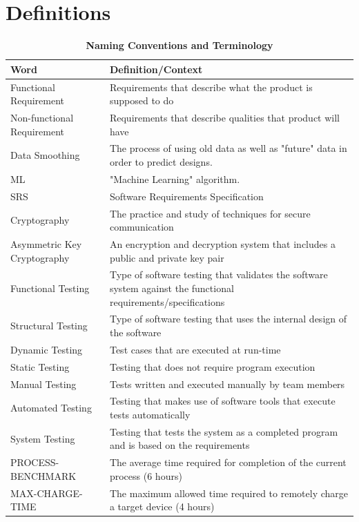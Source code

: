 \documentclass[12pt, titlepage]{article}
\begin{document}
\section{Definitions}
\begin{table}[H]
\caption{\bf Naming Conventions and Terminology}
\begin{tabular}{ |p{6cm}|p{8cm}|  } 
 \hline
\bf Word & \bf Definition/Context\\
 \hline
 Functional Requirement & Requirements that describe what the product is supposed to do\\
 \hline
Non-functional Requirement & Requirements that describe qualities that product will have\\
\hline
Data Smoothing & The process of using old data as well as "future" data in order to predict designs.\\
\hline
ML & "Machine Learning" algorithm.\\
\hline
SRS & Software Requirements Specification\\
\hline
Cryptography & The practice and study of techniques for secure communication\\
\hline
Asymmetric Key Cryptography & An encryption and decryption system that includes a public and private key pair\\
\hline
Functional Testing & Type of software testing that validates the software system against the functional requirements/specifications\\
\hline
Structural Testing & Type of software testing that uses the internal design of the software\\
\hline
Dynamic Testing & Test cases that are executed at run-time\\
\hline
Static Testing & Testing that does not require program execution\\
\hline
Manual Testing & Tests written and executed manually by team members\\
\hline
Automated Testing & Testing that makes use of software tools that execute tests automatically\\
\hline
System Testing & Testing that tests the system as a completed program and is based on the requirements\\
\hline
PROCESS-BENCHMARK & The average time required for completion of the current process (6 hours)\\
\hline
MAX-CHARGE-TIME & The maximum allowed time required to remotely charge a target device (4 hours)\\
\hline
\end{tabular}
\end{table}
\end{document}
